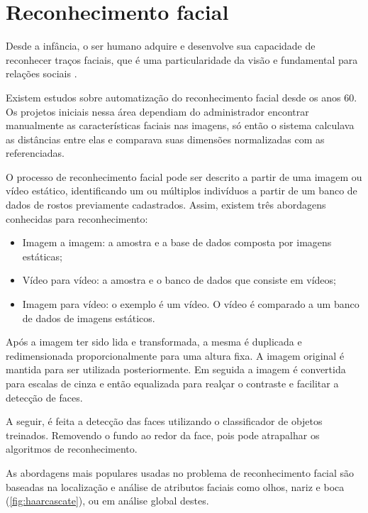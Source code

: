 \section{Reconhecimento facial}\label{sec:reconhecimento}

Desde a infância, o ser humano adquire e desenvolve sua capacidade de reconhecer traços faciais, 
que é uma particularidade da visão e fundamental para relações sociais \cite{rouhani2019}.

Existem estudos sobre automatização do reconhecimento facial desde os anos 60. Os projetos iniciais nessa 
área dependiam do administrador encontrar manualmente as características faciais nas imagens, só 
então o sistema calculava as distâncias entre elas e comparava suas dimensões normalizadas com 
as referenciadas.

O processo de reconhecimento facial pode ser descrito a partir de uma imagem ou vídeo estático, 
identificando um ou múltiplos indivíduos a partir de um banco de dados de rostos previamente 
cadastrados. Assim, existem três abordagens conhecidas para reconhecimento:

\begin{itemize}
    \item Imagem a imagem: a amostra e a base de dados composta por imagens estáticas;

    \item Vídeo para vídeo: a amostra e o banco de dados que consiste em vídeos;

    \item Imagem para vídeo: o exemplo é um vídeo. O vídeo é comparado a um banco de 
    dados de imagens estáticos. 
\end{itemize}

Após a imagem ter sido lida e transformada, a mesma é duplicada e redimensionada 
proporcionalmente para uma altura fixa. A imagem original é mantida para ser 
utilizada posteriormente. Em seguida a imagem é convertida para escalas de 
cinza e então equalizada para realçar o contraste e facilitar a detecção de faces.

A seguir, é feita a detecção das faces utilizando o classificador 
de objetos treinados. Removendo o fundo ao redor da face, pois 
pode atrapalhar os algoritmos de reconhecimento.

As abordagens mais populares usadas no problema de reconhecimento facial são 
baseadas na localização e análise de atributos faciais como olhos, nariz e 
boca (\autoref{fig:haarcascate}), ou em análise global destes.

